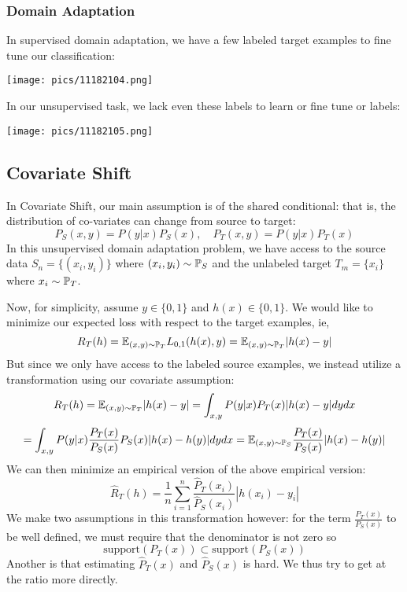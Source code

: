 \documentclass[11pt]{scrartcl}
\begin{document}
\subsubsection{Domain Adaptation}
In supervised domain adaptation, we have a few labeled target examples to fine tune our classification: 
\begin{center}
\texttt{[image: pics/11182104.png]}
\end{center}
In our unsupervised task, we lack even these labels to learn or fine tune or labels: 
\begin{center}
    \texttt{[image: pics/11182105.png]}
\end{center}
\subsection{Covariate Shift}
In Covariate Shift, our main assumption is of the shared conditional: that is, the distribution of co-variates can change from source to target: $$P_S(x,y)=P(y|x)P_S(x), \quad P_T(x,y)=P(y|x)P_T(x)$$
In this unsupervised domain adaptation problem, we have access to the source data $S_n=\{(x_i,y_i)\}$ where $(x_i,y_i) \sim \mathbb{P}_S$ and the unlabeled target $T_m=\{x_i\}$ where $x_i \sim \mathbb{P}_T$. 

Now, for simplicity, assume $y \in \{0,1\}$ and $h(x) \in \{0,1\}$. We would like to minimize our expected loss with respect to the target examples, ie, $$R_T(h)=\mathbb{E}_{(x,y) \sim \mathbb{P}_T} L_{0,1}(h(x),y)=\mathbb{E}_{(x,y) \sim \mathbb{P}_T}|h(x)-y|$$ But since we only have access to the labeled source examples, we instead utilize a transformation using our covariate assumption:
$$R_T(h)=\mathbb{E}_{(x,y) \sim \mathbb{P}_T}|h(x)-y|=\int_{x,y}P(y|x)P_T(x)|h(x)-y|dydx$$
$$=\int_{x,y}P(y|x)\frac{P_T(x)}{P_S(x)}P_S(x)|h(x)-h(y)|dydx=\mathbb{E}_{(x,y) \sim \mathbb{P}_S}\frac{P_T(x)}{P_S(x)}|h(x)-h(y)|$$
We can then minimize an empirical version of the above empirical version: 
$$\hat{R}_T(h)=\frac{1}{n}\sum_{i=1}^{n}\frac{\hat{P}_T(x_i)}{\hat{P}_S(x_i)}|h(x_i)-y_i|$$
We make two assumptions in this transformation however: for the term $\frac{P_T(x)}{P_S(x)}$ to be well defined, we must require that the denominator is not zero so $$ \text{support}(P_T(x))\subset \text{support}(P_S(x))$$
Another is that estimating $\hat{P}_T(x)$ and $\hat{P}_S(x)$ is hard. We thus try to get at the ratio more directly. 
\end{document}
